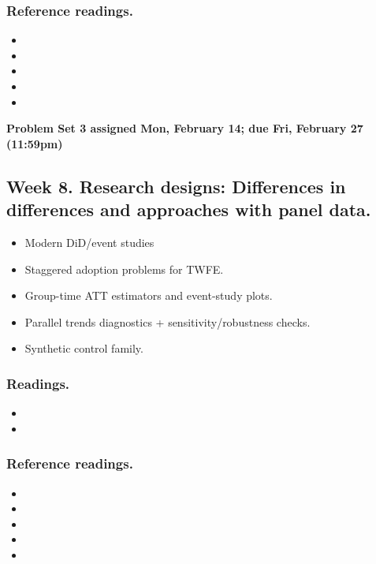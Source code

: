 \documentclass[letterpaper, 12pt, parskip=full,DIV=10]{scrartcl}
\begin{document}
\subsubsection*{Reference readings.}
\begin{itemize}
\item {}
\item {}
\item {}
\item {}
\item {}

\end{itemize}

\textbf{Problem Set 3 assigned Mon, February 14; due Fri, February 27 (11:59pm)}

\subsection*{Week 8. Research designs: Differences in differences and approaches with panel data.}
\begin{itemize}
\item Modern DiD/event studies
\item Staggered adoption problems for TWFE.
\item Group-time ATT estimators and event-study plots.
\item Parallel trends diagnostics + sensitivity/robustness checks.
\item Synthetic control family.
\end{itemize}

\subsubsection*{Readings.}
\begin{itemize}
\item {}
\item {}
\end{itemize}

\subsubsection*{Reference readings.}
\begin{itemize}
\item {}
\item {}
\item {}
\item {}
\item {}
\end{itemize}
\end{document}
